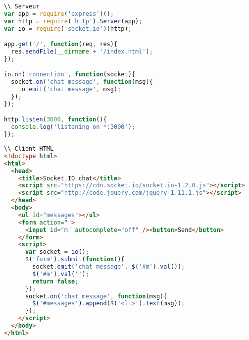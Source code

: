 \lstset{style=mystyle} 
\begin{lstlisting}[language=JavaScript]
\\ Serveur
var app = require('express')();
var http = require('http').Server(app);
var io = require('socket.io')(http);

app.get('/', function(req, res){
  res.sendFile(__dirname + '/index.html');
});

io.on('connection', function(socket){
  socket.on('chat message', function(msg){
    io.emit('chat message', msg);
  });
});

http.listen(3000, function(){
  console.log('listening on *:3000');
});
\end{lstlisting}


\lstset{style=mystyle} 
\begin{lstlisting}[language=Html]
\\ Client HTML
<!doctype html>
<html>
  <head>
    <title>Socket.IO chat</title>
    <script src="https://cdn.socket.io/socket.io-1.2.0.js"></script>
    <script src="http://code.jquery.com/jquery-1.11.1.js"></script>
  </head>
  <body>
    <ul id="messages"></ul>
    <form action="">
      <input id="m" autocomplete="off" /><button>Send</button>
    </form>
    <script>
      var socket = io();
      $('form').submit(function(){
        socket.emit('chat message', $('#m').val());
        $('#m').val('');
        return false;
      });
      socket.on('chat message', function(msg){
        $('#messages').append($('<li>').text(msg));
      });
    </script>
  </body>
</html>
\end{lstlisting}
